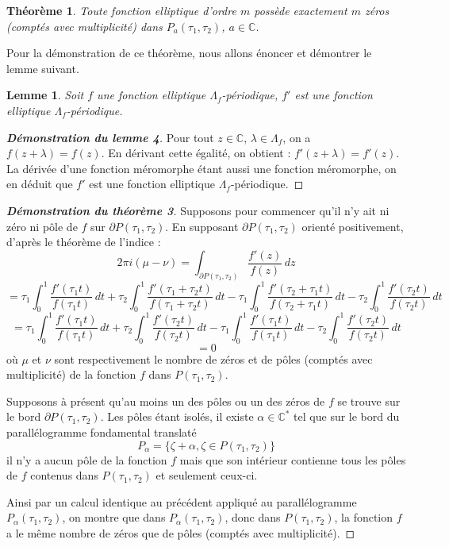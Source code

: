\documentclass[12pt]{article}
\newtheorem{lemma}{Lemme}
\newtheorem{theorem}{Théorème}
\begin{document}
\begin{theorem}
    Toute fonction elliptique d'ordre \( m \) possède exactement \( m \) zéros (comptés avec multiplicité) dans \( P_{a}(\tau_1, \tau_2) \), \( a \in \mathbb{C} \).
    \end{theorem}
Pour la démonstration de ce théorème, nous allons énoncer et démontrer le lemme suivant.

    \begin{lemma}
    Soit \( f \) une fonction elliptique \( \Lambda_f \)-périodique, \( f' \) est une fonction elliptique \( \Lambda_f\)-périodique.
    \end{lemma}

    \begin{proof}[\textbf{Démonstration du lemme 4}]
    Pour tout \( z \in \mathbb{C} \), \( \lambda \in \Lambda_f \), on a \( f(z + \lambda) = f(z) \). En dérivant cette égalité, on obtient : \( f'(z + \lambda) = f'(z) \). La dérivée d'une fonction méromorphe étant aussi une fonction méromorphe, on en déduit que \( f' \) est une fonction elliptique \( \Lambda_f \)-périodique.
    \end{proof}

    \begin{proof}[\textbf{Démonstration du théorème 3}]
    Supposons pour commencer qu'il n'y ait ni zéro ni pôle de \( f \) sur \( \partial P(\tau_1, \tau_2) \). En supposant \( \partial P(\tau_1, \tau_2) \) orienté positivement, d'après le théorème de l'indice :
    \[
    2\pi i(\mu - \nu) = \int_{\partial P(\tau_1, \tau_2)} \frac{f'(z)}{f(z)} \, dz
    \]
    \[
    = \tau_1 \int_0^1 \frac{f'(\tau_1 t)}{f(\tau_1 t)} \, dt + \tau_2 \int_0^1 \frac{f'(\tau_1 + \tau_2 t)}{f(\tau_1 + \tau_2 t)} \, dt - \tau_1 \int_0^1 \frac{f'(\tau_2 + \tau_1 t)}{f(\tau_2 + \tau_1 t)} \, dt - \tau_2 \int_0^1 \frac{f'(\tau_2 t)}{f(\tau_2 t)} \, dt
    \]
    \[
    = \tau_1 \int_0^1 \frac{f'(\tau_1 t)}{f(\tau_1 t)} \, dt + \tau_2\int_0^1 \frac{f'( \tau_2 t)}{f( \tau_2 t)} \, dt - \tau_1\int_0^1 \frac{f'( \tau_1 t)}{f( \tau_1 t)} \, dt - \tau_2\int_0^1 \frac{f'(\tau_2 t)}{f(\tau_2 t)} \, dt
    \]
    \[
    = 0
    \]
    où \( \mu \) et \( \nu \) sont respectivement le nombre de zéros et de pôles (comptés avec multiplicité) de la fonction \( f \) dans \( P(\tau_1, \tau_2) \).

    Supposons à présent qu'au moins un des pôles ou un des zéros de \( f \) se trouve sur le bord \( \partial P(\tau_1, \tau_2) \). Les pôles étant isolés, il existe \( \alpha \in \mathbb{C}^* \) tel que sur le bord du parallélogramme fondamental translaté
    \[
    P_\alpha = \{\zeta + \alpha, \zeta \in P(\tau_1, \tau_2)\}
    \]
    il n'y a aucun pôle de la fonction \( f \) mais que son intérieur contienne tous les pôles de \( f \) contenus dans \( P(\tau_1, \tau_2) \) et seulement ceux-ci.

    Ainsi par un calcul identique au précédent appliqué au parallélogramme \( P_\alpha(\tau_1, \tau_2) \), on montre que dans \( P_\alpha(\tau_1, \tau_2) \), donc dans \( P(\tau_1, \tau_2) \), la fonction \( f \) a le même nombre de zéros que de pôles (comptés avec multiplicité).
    \end{proof}
\end{document}

